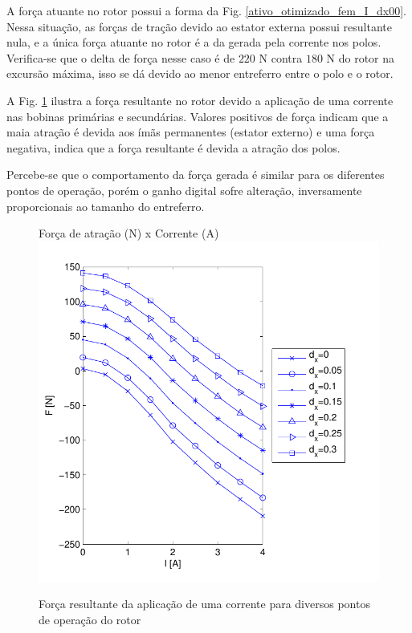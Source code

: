 A força atuante no rotor possui a forma da   Fig. \ref{ativo_otimizado_fem_I_dx00}.   Nessa situação, as forças de tração devido ao estator externa possui resultante nula, e a única força atuante no rotor é a da gerada pela corrente nos polos. Verifica-se que o delta de força nesse caso é de $220$ N contra $180$ N do rotor na excursão máxima, isso se dá devido ao menor entreferro entre o polo e o rotor.

A Fig. \ref{ativo_otimizado_fem_I_dx_map} ilustra a força resultante no rotor devido a aplicação de uma corrente nas bobinas primárias e secundárias. Valores positivos de força indicam que a  maia atração é devida aos ímãs permanentes (estator externo) e uma força negativa, indica que a força resultante é devida a atração dos polos.

Percebe-se que o comportamento da força gerada é similar para os diferentes pontos de operação, porém o ganho digital sofre alteração, inversamente proporcionais ao tamanho do entreferro.

\begin{figure}[t!]
\centering
Força de atração (N) x Corrente (A)
\includegraphics[width=0.8\linewidth]{Figs/Simulacoes/Ativo/ativo_otimizado_fem_I_dx_map.pdf}
\caption{Força resultante da aplicação de uma corrente  para diversos pontos de operação do rotor}
\label{ativo_otimizado_fem_I_dx_map}
\end{figure}


